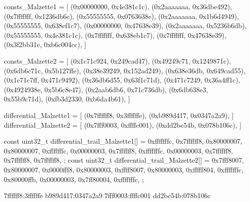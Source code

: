 consts_Malzette1 = [
    (0x00000000, 0x4e381c1c),
    (0x2aaaaaaa, 0x36dbe492),
    (0x7fffffff, 0x1236db6c),
    (0x55555555, 0x0763638e),
    (0x2aaaaaaa, 0x1b6d4949),
    (0x55555555, 0x638ef1c7),
    (0x00000000, 0x47638e39),
    (0x2aaaaaaa, 0x5236b6db),
    (0x55555555, 0x4e381c1c),
    (0x7fffffff, 0x638eb1c7),
    (0x7fffffff, 0x47638e39),
    (0x3f2bb31e, 0xb6c004cc),
]

consts_Malzette2 = [
    (0x1c71c924, 0x249cad47),
    (0x49249c71, 0x1249871c),
    (0x6db6c71c, 0x5b127ffe),
    (0x38e39249, 0x152ad249),
    (0x638e36db, 0x649cad55),
    (0x1c71c7ff, 0x471c9492),
    (0x36db6d55, 0x63f1c71d),
    (0x471c7249, 0x36a4ff1c),
    (0x4924938e, 0x5b6c8e47),
    (0x2aab6db6, 0x71c736db),
    (0x6db638e3, 0x55b9c71d),
    (0xfb3d2330, 0xb6da4b61),
]

differential_Malzette1 = [
    (0x7ffffff8, 0x3ffffffe),
    (0xb989d417, 0x0347a2a9),
]
differential_Malzette2 = [
    (0x7fff0003, 0xffffc001),
    (0xdd2bc54b, 0x078b106c),
]

const uint32_t differential_trail_Malzette1[] = {
    0xfffffffc,
    0x7ffffff8,
    0x80000007,
    0x80000007,
    0xfffffffc,
    0x00000003,
    0x7ffffff8,
    0xfffffffc,
    0x00000003,
    0x7ffffff8,
    0x7ffffff8,
    0x7ffffff8,
};
const uint32_t differential_trail_Malzette2[] = {
    0x7fff8007,
    0x80000007,
    0x0000fff8,
    0x80000003,
    0xffff8007,
    0x80000003,
    0xfffff804,
    0xfffffffc,
    0x80000ffb,
    0x00000003,
    0x7ff80004,
    0xfffffffc,
};

7ffffff8:3ffffffe
b989d417:0347a2a9
7fff0003:ffffc001
dd2bc54b:078b106c
